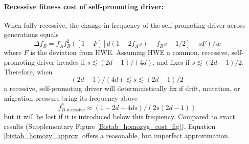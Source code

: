 \documentclass[12pt,letterpaper]{article}
\begin{document}
\paragraph{Recessive fitness cost of self-promoting driver:} %
When fully recessive, the change in frequency of the self-promoting driver across generations equals 
\begin{equation}
\Delta f_B=f_A f_B^2 \left( [1-F][ d(1-2 f_A s) - f_B s-1/2] - s  F \right)/\bar{w}
\label{deltadriver}
\end{equation}
where $F$ is the deviation from HWE. 
Assuming HWE a common, recessive, self-promoting driver invades if $s\lesssim(2 d - 1)/(4 d)$, and fixes if
 $s\lesssim(2d-1)/2$. 
 Therefore, when \begin{equation}(2 d - 1)/(4 d)  \lesssim  s  \lesssim  (2d-1)/2\label{ineqA}\end{equation} a
 	recessive, self-promoting driver will deterministically fix if drift,
 	mutation, or migration pressure bring its frequency above
\begin{equation} 
f^*_{B\text{ recessive}} \approx (1-2d+4ds)/(2s(2d-1)) \label{bistab_homozy_approx}
\end{equation}
 but it will be lost if it is introduced below this frequency. 
Compared to exact results (Supplementary Figure \ref{Bistab_homozyg_cost_fig}), Equation
 \eqref{bistab_homozy_approx} offers a reasonable, but imperfect approximation. 
\end{document}

